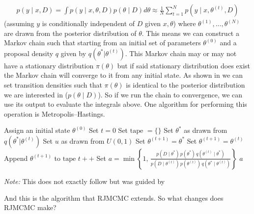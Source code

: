 \documentclass[10pt]{article}
\begin{document}
\begin{align*}
p(y\mid x,D)
= \int p(y\mid x,\theta,D)p(\theta\mid D)d\theta
\approx \frac{1}{N}\sum_{t=1}^{N}
p(y\mid x,\theta^{(t)},D)
\end{align*} (assuming \(y\) is conditionally independent of \(D\) given \(x,\theta\))
where \(\theta^{(1)}, ... , \theta^{(N)}\) are drawn from the posterior distribution of \(\theta\). This means we can construct a Markov chain such that starting from an initial set of parameters \(\theta^{(0)}\) and a proposal density \(q\) given by \(q(\theta^{*}|\theta^{(t)})\). This Markov chain may or may not have a stationary distribution \(\pi(\theta)\) but if said stationary distribution does exist the Markov chain will converge to it from any initial state. As shown in \textcite{hastings1970monte} we can set transition densities such that \(\pi(\theta)\) is identical to the posterior distribution we are interested in (\(p(\theta \mid D)\)). So if we run the chain to convergence, we can use its output to evaluate the integrals above. One algorithm for performing this operation is Metropolis–Hastings.  
\begin{algorithm}[h!]
	\caption{Metropolis–Hastings sampler}
	\label{alg:mhs}
	\begin{algorithmic}[1]
		\State Assign an initial state $\theta^{(0)}$
		\State Set $t = 0$
		\State Set $\text{tape } = \{\}$
			\State Set $\theta^*$ as drawn from $q(\theta^* | \theta^{(t)})$
			\State Set $u$ as drawn from $U(0, 1)$
				\State Set $\theta^{(t+1)} = \theta^*$
			\Else
				\State Set $\theta^{(t+1)} = \theta^{(t)}$
			\EndIf
			\State Append $\theta^{(t+1)}$ to $\text{tape}$
			\State $t++$
		\EndFor
		\State {}
		\Statex
			\State Set $a = \min\left\{
			1,\,
			\frac{
			  p(D\mid\theta^*)\,p(\theta^*)\,
			  q(\theta^{(t)} \mid \theta^*)
			}{
			  p(D\mid\theta^{(t)})\,p(\theta^{(t)})\,
			  q(\theta^* \mid \theta^{(t)})
			}
			\right\}$
			\State \Return $a$
		\EndFunction
	\end{algorithmic}
	\par\smallskip
{\footnotesize \textit{Note:} This does not exactly follow but was guided by \cite{denison2002bayesian} \par}
\end{algorithm}

And this is the algorithm that RJMCMC extends. So what changes does RJMCMC make?
\end{document}
